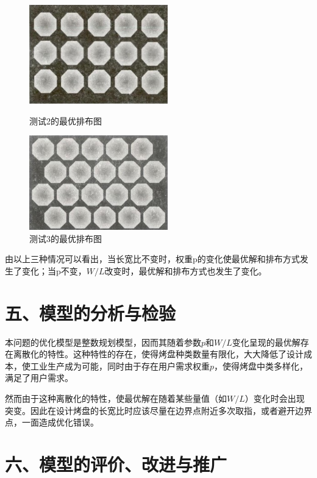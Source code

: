 \documentclass{my_paper}
\begin{document}
\begin{figure}[htbp]
    \centering
    \begin{minipage}[t]{0.48\textwidth}
        \centering
        \includegraphics[width=6cm]{test2.jpg}
        \caption{测试2的最优排布图}
        \label{test2}
    \end{minipage}
    \begin{minipage}[t]{0.48\textwidth}
        \centering
        \includegraphics[width=6cm]{test3.jpg}
        \caption{测试3的最优排布图}
        \label{test3}
    \end{minipage}
\end{figure}

由以上三种情况可以看出，当长宽比不变时，权重p的变化使最优解和排布方式发生了变化；当p不变，$W/L$改变时，最优解和排布方式也发生了变化。


\section{五、模型的分析与检验}
本问题的优化模型是整数规划模型，因而其随着参数$p$和$W/L$变化呈现的最优解存在离散化的特性。这种特性的存在，使得烤盘种类数量有限化，大大降低了设计成本，使工业生产成为可能，同时由于存在用户需求权重$p$，使得烤盘中类多样化，满足了用户需求。

然而由于这种离散化的特性，使最优解在随着某些量值（如$W/L$）变化时会出现突变。因此在设计烤盘的长宽比时应该尽量在边界点附近多次取指，或者避开边界点，一面造成优化错误。

\section{六、模型的评价、改进与推广}
\end{document}
